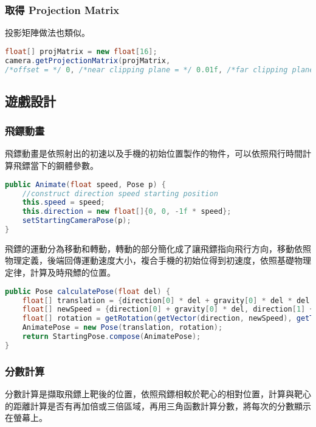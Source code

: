 \subsubsection{取得 Projection Matrix}

投影矩陣做法也類似。

\begin{lstlisting}[language=Java, caption=取得 Projection Matrix]
float[] projMatrix = new float[16];
camera.getProjectionMatrix(projMatrix,
/*offset = */ 0, /*near clipping plane = */ 0.01f, /*far clipping plane = */ 15.0f);
\end{lstlisting}


\subsection{遊戲設計}

\subsubsection{飛鏢動畫}

飛鏢動畫是依照射出的初速以及手機的初始位置製作的物件，可以依照飛行時間計算飛鏢當下的鋼體參數。

\begin{lstlisting}[language=Java, caption=Animate]
public Animate(float speed, Pose p) {
    //construct direction speed starting position
    this.speed = speed;
    this.direction = new float[]{0, 0, -1f * speed};
    setStartingCameraPose(p);
}
\end{lstlisting}

飛鏢的運動分為移動和轉動，轉動的部分簡化成了讓飛鏢指向飛行方向，移動依照物理定義，後端回傳運動速度大小，複合手機的初始位得到初速度，依照基礎物理定律，計算及時飛鰾的位置。

\begin{lstlisting}[language=Java, caption=calculatePose]
public Pose calculatePose(float del) {
    float[] translation = {direction[0] * del + gravity[0] * del * del, direction[1] * del + gravity[1] * del * del, direction[2] * del + gravity[2] * del * del};
    float[] newSpeed = {direction[0] + gravity[0] * del, direction[1] + gravity[1] * del, direction[2] + gravity[2] * del};
    float[] rotation = getRotation(getVector(direction, newSpeed), getTheta(direction, newSpeed));
    AnimatePose = new Pose(translation, rotation);
    return StartingPose.compose(AnimatePose);
}
\end{lstlisting}

\subsubsection{分數計算}

分數計算是擷取飛鏢上靶後的位置，依照飛鏢相較於靶心的相對位置，計算與靶心的距離計算是否有再加倍或三倍區域，再用三角函數計算分數，將每次的分數顯示在螢幕上。

